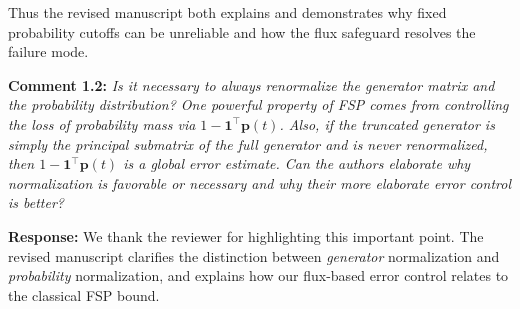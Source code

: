 \documentclass[11pt]{article}
\begin{document}
Thus the revised manuscript both explains and demonstrates why fixed probability
cutoffs can be unreliable and how the flux safeguard resolves the failure mode.

\vspace{0.5em}

\noindent\textbf{Comment 1.2:} \textit{Is it necessary to always renormalize the generator matrix and the
probability distribution? One powerful property of FSP comes from controlling
the loss of probability mass via $1-\mathbf{1}^\top\mathbf{p}(t)$. Also, if the
truncated generator is simply the principal submatrix of the full generator and
is never renormalized, then $1-\mathbf{1}^\top\mathbf{p}(t)$ is a global error
estimate. Can the authors elaborate why normalization is favorable or necessary
and why their more elaborate error control is better?}

\textbf{Response:} We thank the reviewer for highlighting this important point. The
revised manuscript clarifies the distinction between \emph{generator} normalization
and \emph{probability} normalization, and explains how our flux-based error control
relates to the classical FSP bound.
\end{document}
